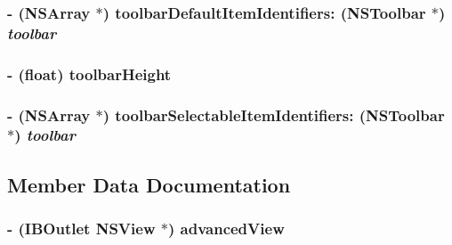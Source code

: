 \hypertarget{interface_c_m_window_controller_a279ef0d596af18bf3cc33be365cc77c}{
\subsubsection[toolbarDefaultItemIdentifiers:]{\setlength{\rightskip}{0pt plus 5cm}- (NSArray $\ast$) toolbarDefaultItemIdentifiers: (NSToolbar $\ast$) {\em toolbar}}}
\label{interface_c_m_window_controller_a279ef0d596af18bf3cc33be365cc77c}


\hypertarget{interface_c_m_window_controller_eac4c2bb1286f184886ac4ad40af899a}{
\subsubsection[toolbarHeight]{\setlength{\rightskip}{0pt plus 5cm}- (float) toolbarHeight }}
\label{interface_c_m_window_controller_eac4c2bb1286f184886ac4ad40af899a}


\hypertarget{interface_c_m_window_controller_09a848e0edfe89c56c873f0ccec55ec8}{
\subsubsection[toolbarSelectableItemIdentifiers:]{\setlength{\rightskip}{0pt plus 5cm}- (NSArray $\ast$) toolbarSelectableItemIdentifiers: (NSToolbar $\ast$) {\em toolbar}}}
\label{interface_c_m_window_controller_09a848e0edfe89c56c873f0ccec55ec8}




\subsection{Member Data Documentation}
\hypertarget{interface_c_m_window_controller_a673b337109398fa2b8e138fe9f08224}{
\subsubsection[advancedView]{\setlength{\rightskip}{0pt plus 5cm}- (IBOutlet {\bf NSView} $\ast$) {\bf advancedView}}}
\label{interface_c_m_window_controller_a673b337109398fa2b8e138fe9f08224}


